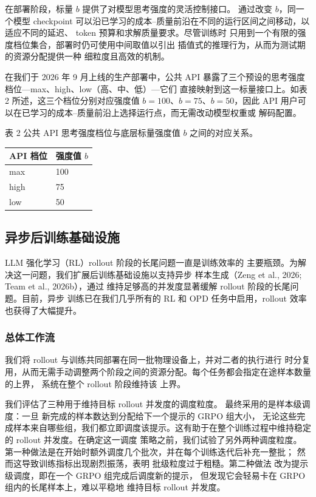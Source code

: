 \documentclass[
  10
]{article}
\newcounter{none} %
\begin{document}
在部署阶段，标量 $b$ 提供了对模型思考强度的灵活控制接口。
通过改变 $b$，同一个模型 checkpoint 可以沿已学习的成本--质量前沿在不同的运行区间之间移动，以适应不同的延迟、
token 预算和求解质量要求。尽管训练时
只用到一个有限的强度档位集合，部署时仍可使用中间取值以引出
插值式的推理行为，从而为测试期的资源分配提供一种
细粒度且高效的机制。

在我们于 2026 年 9 月上线的生产部署中，公共 API
暴露了三个预设的思考强度档位---max、high、low（高、中、低）---它们
直接映射到这一标量接口上。如表 2 所述，这三个档位分别对应强度值 $b = 100$、$b = 75$、$b = 50$，因此 API 用户可以在已学习的成本--质量前沿上选择运行点，而无需改动模型权重或
解码配置。

表 2 \textbar{} 公共 API 思考强度档位与底层标量强度值 $b$ 之间的对应关系。

{\def\LTcaptype{none} %
\begin{longtable}[]{@{}|l|l|@{}}
\toprule\noalign{}
\endhead
\bottomrule\noalign{}
\endlastfoot
\hline
API 档位 & 强度值 $b$ \\
\hline
max & 100 \\
\hline
high & 75 \\
\hline
low & 50 \\
\hline
\end{longtable}
}

\subsection{异步后训练基础设施}\label{asynchronous-post-training-infrastructure}

LLM 强化学习（RL）rollout 阶段的长尾问题一直是训练效率的
主要瓶颈。为解决这一问题，我们扩展后训练基础设施以支持异步
样本生成（Zeng et al., 2026; Team et al., 2026b），通过
维持足够高的并发度显著缓解 rollout 阶段的长尾问题。目前，异步
训练已在我们几乎所有的 RL 和 OPD 任务中启用，rollout
效率也获得了大幅提升。

\subsubsection{总体工作流}\label{overall-workflow}

我们将 rollout 与训练共同部署在同一批物理设备上，并对二者的执行进行
时分复用，从而无需手动调整两个阶段之间的资源分配。每个任务都会指定在途样本数量的上界，
系统在整个 rollout 阶段维持该
上界。

我们评估了三种用于维持目标 rollout 并发度的调度粒度。
最终采用的是样本级调度：一旦
新完成的样本数达到分配给下一个提示的 GRPO 组大小，
无论这些完成样本来自哪些组，我们都立即调度该提示。这有助于在整个训练过程中维持稳定的 rollout
并发度。在确定这一调度
策略之前，我们试验了另外两种调度粒度。
第一种做法是在开始时额外调度几个批次，并在每个训练迭代后补充一整批；
然而这导致训练指标出现剧烈振荡，表明
批级粒度过于粗糙。第二种做法
改为提示级调度，即在一个 GRPO 组完成后调度新的提示，
但发现它会轻易卡在 GRPO 组内的长尾样本上，难以平稳地
维持目标 rollout 并发度。
\end{document}

